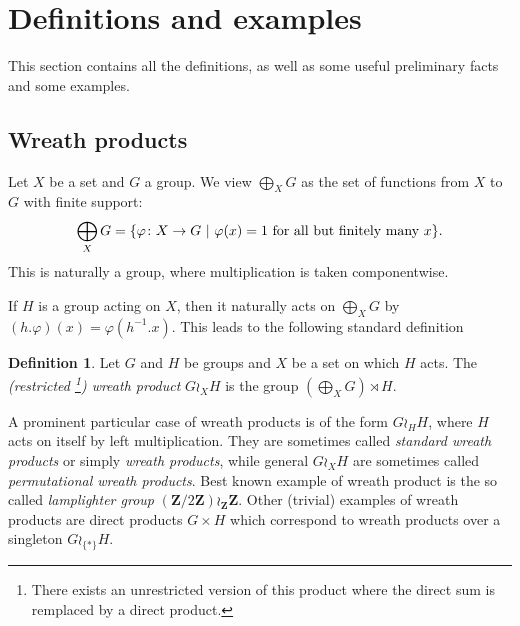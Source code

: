 \documentclass[a4paper]{article}
\theoremstyle{definition}
\newtheorem{defn}[lem]{Definition}
\newcommand*{\field}[1]{\mathbf{#1}}
\newcommand*{\Z}{\field{Z}}
\newcommand{\setst}[2]{\{#1\ |\ #2\}}
\begin{document}
\section{Definitions and examples}\label{Section:Def}
This section contains all the definitions, as well as some useful preliminary facts and some examples.
%
%
%
%
%
%
%
%
%
%
\subsection{Wreath products}
%
%
%
%
%
Let $X$ be a set and $G$ a group.
We view $\bigoplus_XG$ as the set of functions from $X$ to $G$ with finite support:
\[
	\bigoplus_XG=\setst{\varphi\colon X\to G}{\varphi(x)=1 \textnormal{ for all but finitely many }x}.
\]
This is naturally a group, where multiplication is taken componentwise.

If $H$ is a group acting on $X$, then it naturally acts on $\bigoplus_XG$
by $(h.\varphi)(x)=\varphi(h^{-1}.x)$.
This leads to the following standard definition
\begin{defn}\label{Def:WreathProd}
Let $G$ and $H$ be groups and $X$ be a set on which $H$ acts.
The \emph{(restricted \footnote{There exists an unrestricted version of this product where the direct sum is remplaced by a direct product.}) wreath product} $G\wr_XH$ is the group $(\bigoplus_XG)\rtimes H$.
\end{defn}
A prominent particular case of wreath products is of the form $G\wr_HH$, where $H$ acts on itself by left multiplication.
They are sometimes called \emph{standard wreath products} or simply \emph{wreath products}, while general $G\wr_XH$ are sometimes called \emph{permutational wreath products}.
Best known example of wreath product is the so called \emph{lamplighter group} $(\Z/2\Z)\wr_\Z\Z$.
Other (trivial) examples of wreath products are direct products $G\times H$ which correspond to wreath products over a singleton $G\wr_{\{*\}}H$.
%
%
%
%
%
%
%
%
%
%
\end{document}
